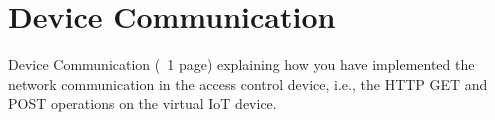 \section{Device Communication}
\label{sec:prototype}

Device Communication (~1 page) explaining how you have implemented the network communication in the access control device, i.e., the HTTP GET and POST operations on the virtual IoT device.